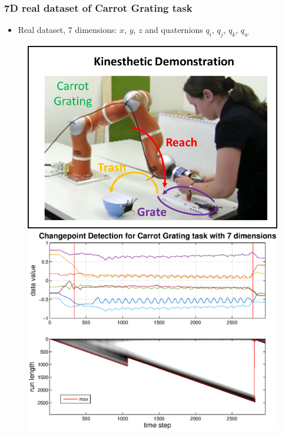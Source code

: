 \documentclass{beamer} %
\begin{document}
\begin{frame}
\frametitle{7D real dataset of Carrot Grating task}
\begin{itemize}
\item Real dataset, 7 dimensions: $x$, $y$, $z$ and quaternions $q_i$, $q_j$, $q_k$, $q_w$
\end{itemize}
\begin{figure}
\centering
\begin{minipage}{.5\textwidth}
  \centering
  \includegraphics[width=.9\linewidth]{carrot_grating.png}
\end{minipage}%
\begin{minipage}{.5\textwidth}
  \includegraphics[width=\linewidth]{carrot_fast.eps}
\end{minipage}
\end{figure}
\end{frame}
\end{document}
